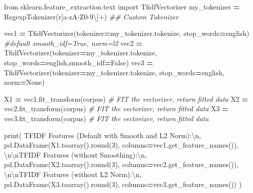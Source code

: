 \documentclass[
]{book}
\newenvironment{Shaded}{\begin{snugshade}}{\end{snugshade}}
\newcommand{\BuiltInTok}[1]{#1}
\newcommand{\CharTok}[1]{\textcolor[rgb]{0.5,0.5,0.5}{#1}}
\newcommand{\CommentTok}[1]{\textcolor[rgb]{0.37,0.37,0.37}{\textit{#1}}}
\newcommand{\DecValTok}[1]{\textcolor[rgb]{0.06,0.06,0.06}{#1}}
\newcommand{\ImportTok}[1]{#1}
\newcommand{\NormalTok}[1]{#1}
\newcommand{\OperatorTok}[1]{\textcolor[rgb]{0.43,0.43,0.43}{\textbf{#1}}}
\newcommand{\StringTok}[1]{\textcolor[rgb]{0.5,0.5,0.5}{#1}}
\newcommand{\VariableTok}[1]{\textcolor[rgb]{0,0,0}{#1}}
\newcommand{\VerbatimStringTok}[1]{\textcolor[rgb]{0.5,0.5,0.5}{#1}}
\begin{document}
\begin{Shaded}
\begin{Highlighting}[]
\ImportTok{from}\NormalTok{ sklearn.feature\_extraction.text }\ImportTok{import}\NormalTok{ TfidfVectorizer}
\NormalTok{my\_tokenizer }\OperatorTok{=}\NormalTok{ RegexpTokenizer(}\VerbatimStringTok{r\textquotesingle{}[a{-}zA{-}Z0{-}9\textbackslash{}\textquotesingle{}]+\textquotesingle{}}\NormalTok{)  }\CommentTok{\#\# Custom Tokenizer}

\NormalTok{vec1 }\OperatorTok{=}\NormalTok{ TfidfVectorizer(tokenizer}\OperatorTok{=}\NormalTok{my\_tokenizer.tokenize,  stop\_words}\OperatorTok{=}\StringTok{\textquotesingle{}english\textquotesingle{}}\NormalTok{) }\CommentTok{\#default smooth\_idf=True, norm=\textquotesingle{}l2\textquotesingle{}}
\NormalTok{vec2 }\OperatorTok{=}\NormalTok{ TfidfVectorizer(tokenizer}\OperatorTok{=}\NormalTok{my\_tokenizer.tokenize, stop\_words}\OperatorTok{=}\StringTok{\textquotesingle{}english\textquotesingle{}}\NormalTok{,smooth\_idf}\OperatorTok{=}\VariableTok{False}\NormalTok{)}
\NormalTok{vec3 }\OperatorTok{=}\NormalTok{ TfidfVectorizer(tokenizer}\OperatorTok{=}\NormalTok{my\_tokenizer.tokenize, stop\_words}\OperatorTok{=}\StringTok{\textquotesingle{}english\textquotesingle{}}\NormalTok{, norm}\OperatorTok{=}\VariableTok{None}\NormalTok{)}

\NormalTok{X1   }\OperatorTok{=}\NormalTok{ vec1.fit\_transform(corpus)  }\CommentTok{\# FIT the vectorizer, return fitted data}
\NormalTok{X2   }\OperatorTok{=}\NormalTok{ vec2.fit\_transform(corpus)  }\CommentTok{\# FIT the vectorizer, return fitted data}
\NormalTok{X3   }\OperatorTok{=}\NormalTok{ vec3.fit\_transform(corpus)  }\CommentTok{\# FIT the vectorizer, return fitted data}

\BuiltInTok{print}\NormalTok{(}
  \StringTok{\textquotesingle{}TFIDF Features (Default with Smooth and L2 Norm):}\CharTok{\textbackslash{}n}\StringTok{\textquotesingle{}}\NormalTok{,}
\NormalTok{  pd.DataFrame(X1.toarray().}\BuiltInTok{round}\NormalTok{(}\DecValTok{3}\NormalTok{), columns}\OperatorTok{=}\NormalTok{vec1.get\_feature\_names()),}
  \StringTok{\textquotesingle{}}\CharTok{\textbackslash{}n\textbackslash{}n}\StringTok{TFIDF Features (without Smoothing):}\CharTok{\textbackslash{}n}\StringTok{\textquotesingle{}}\NormalTok{,}
\NormalTok{  pd.DataFrame(X2.toarray().}\BuiltInTok{round}\NormalTok{(}\DecValTok{3}\NormalTok{), columns}\OperatorTok{=}\NormalTok{vec2.get\_feature\_names()),}
  \StringTok{\textquotesingle{}}\CharTok{\textbackslash{}n\textbackslash{}n}\StringTok{TFIDF Features (without L2 Norm):}\CharTok{\textbackslash{}n}\StringTok{\textquotesingle{}}\NormalTok{,}
\NormalTok{  pd.DataFrame(X3.toarray().}\BuiltInTok{round}\NormalTok{(}\DecValTok{3}\NormalTok{), columns}\OperatorTok{=}\NormalTok{vec3.get\_feature\_names())}
\NormalTok{  )}
\end{Highlighting}
\end{Shaded}
\end{document}
